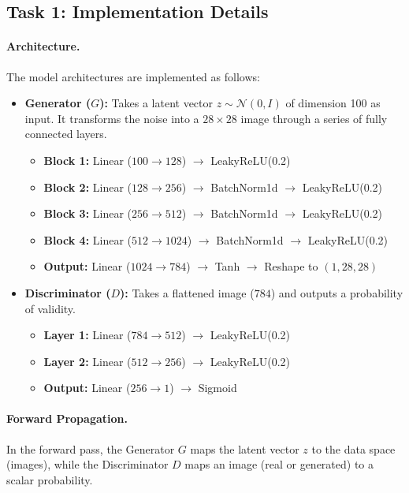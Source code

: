 \documentclass[11pt,a4paper]{article}
\begin{document}
\subsection{Task 1: Implementation Details}
\paragraph{Architecture.} The model architectures are implemented as follows:

\begin{itemize}
    \item \textbf{Generator ($G$):} Takes a latent vector $z \sim \mathcal{N}(0, I)$ of dimension 100 as input. It transforms the noise into a $28 \times 28$ image through a series of fully connected layers.
    \begin{itemize}
        \item \textbf{Block 1:} Linear ($100 \to 128$) $\to$ LeakyReLU(0.2)
        \item \textbf{Block 2:} Linear ($128 \to 256$) $\to$ BatchNorm1d $\to$ LeakyReLU(0.2)
        \item \textbf{Block 3:} Linear ($256 \to 512$) $\to$ BatchNorm1d $\to$ LeakyReLU(0.2)
        \item \textbf{Block 4:} Linear ($512 \to 1024$) $\to$ BatchNorm1d $\to$ LeakyReLU(0.2)
        \item \textbf{Output:} Linear ($1024 \to 784$) $\to$ Tanh $\to$ Reshape to $(1, 28, 28)$
    \end{itemize}
    
    \item \textbf{Discriminator ($D$):} Takes a flattened image ($784$) and outputs a probability of validity.
    \begin{itemize}
        \item \textbf{Layer 1:} Linear ($784 \to 512$) $\to$ LeakyReLU(0.2)
        \item \textbf{Layer 2:} Linear ($512 \to 256$) $\to$ LeakyReLU(0.2)
        \item \textbf{Output:} Linear ($256 \to 1$) $\to$ Sigmoid
    \end{itemize}
\end{itemize}

\paragraph{Forward Propagation.}
In the forward pass, the Generator $G$ maps the latent vector $z$ to the data space (images), while the Discriminator $D$ maps an image (real or generated) to a scalar probability.
\end{document}
